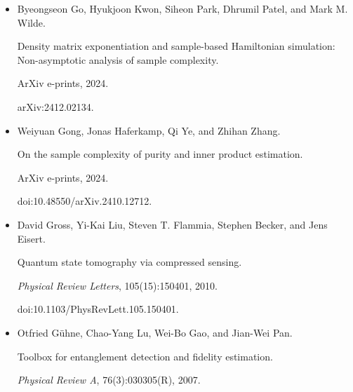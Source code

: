 \documentclass[10pt,a4paper]{article}
\begin{document}
\begin{itemize}
András Gilyén, Yuan Su, Guang Hao Low, and Nathan Wiebe.


Quantum singular value transformation and beyond: exponential
improvements for quantum matrix arithmetics.


In \emph{Proceedings of the 51st Annual ACM SIGACT Symposium on Theory
of Computing}, pages 193–204, 2019.


doi:10.1145/3313276.3316366.





\item[] 
[16]

Byeongseon Go, Hyukjoon Kwon, Siheon Park, Dhrumil Patel, and Mark M. Wilde.


Density matrix exponentiation and sample-based Hamiltonian
simulation: Non-asymptotic analysis of sample complexity.


ArXiv e-prints, 2024.


arXiv:2412.02134.





\item[] 
[17]

Weiyuan Gong, Jonas Haferkamp, Qi Ye, and Zhihan Zhang.


On the sample complexity of purity and inner product estimation.


ArXiv e-prints, 2024.


doi:10.48550/arXiv.2410.12712.





\item[] 
[18]

David Gross, Yi-Kai Liu, Steven T. Flammia, Stephen Becker, and Jens Eisert.


Quantum state tomography via compressed sensing.


\emph{Physical Review Letters}, 105(15):150401, 2010.


doi:10.1103/PhysRevLett.105.150401.





\item[] 
[19]

Otfried Gühne, Chao-Yang Lu, Wei-Bo Gao, and Jian-Wei Pan.


Toolbox for entanglement detection and fidelity estimation.


\emph{Physical Review A}, 76(3):030305(R), 2007.



\end{itemize}
\end{document}
